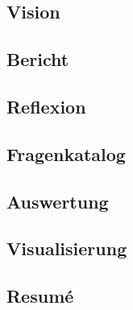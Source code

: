 \documentclass[12pt]{article}
\begin{document}
    \newpage
    \subsection{Vision}
    

    \newpage
    \subsection{Bericht}
    

    \newpage
    \subsection{Reflexion}
    

    \newpage
    \subsection{Fragenkatalog}
    

    \newpage
    \subsection{Auswertung}
    

    \newpage
    \subsection{Visualisierung}
    

    \newpage
    \subsection{Resumé}
    
\end{document}
